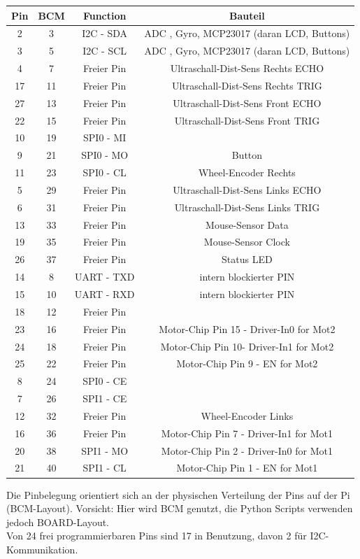 \documentclass[twoside,12pt,a4paper]{report}
\begin{document}
	\begin{center}
		\begin{tabular}{|cc|c|c|}
			\hline
			Pin 	&BCM		& Function 		& Bauteil\\
			\hline
			2		&3			& I2C - SDA		& ADC , Gyro, MCP23017 (daran LCD, Buttons) \\
			3 		&5			& I2C - SCL		& ADC , Gyro, MCP23017 (daran LCD, Buttons)\\
			4		&7			& Freier Pin	& Ultraschall-Dist-Sens Rechts ECHO\\
			17		&11 		& Freier Pin	& Ultraschall-Dist-Sens Rechts TRIG	\\
			27		&13 		& Freier Pin	& Ultraschall-Dist-Sens Front ECHO	\\
			22		&15 		& Freier Pin	& Ultraschall-Dist-Sens Front TRIG	\\
			10		&19 		& SPI0 - MI		& 	\\
			9		&21 		& SPI0 - MO		& Button		\\
			11		&23 		& SPI0 - CL		& Wheel-Encoder Rechts		\\
			5		&29 		& Freier Pin	& Ultraschall-Dist-Sens Links ECHO		\\
			6		&31 		& Freier Pin	& Ultraschall-Dist-Sens Links TRIG	\\
			13		&33 		& Freier Pin	& Mouse-Sensor Data	\\	
			19		&35 		& Freier Pin	& Mouse-Sensor Clock	\\
			26		&37 		& Freier Pin	& Status LED\\
			14		&8 			& UART - TXD	& 	intern blockierter PIN\\
			15		&10 		& UART - RXD	&  	intern blockierter PIN\\
			18		&12 		& Freier Pin	& 	\\
			23 		&16 		& Freier Pin	& Motor-Chip Pin 15 - Driver-In0 for Mot2	\\
			24		&18 		& Freier Pin	& Motor-Chip Pin 10- Driver-In1 for Mot2	\\
			25		&22 		& Freier Pin	& Motor-Chip Pin 9 - EN for Mot2	\\
			8		&24 		& SPI0 - CE		& 	\\
			7		&26 		& SPI1 - CE		&  	\\
			12		&32 		& Freier Pin	& Wheel-Encoder Links	\\
			16		&36 		& Freier Pin	& Motor-Chip Pin 7 - Driver-In1 for Mot1	\\
			20		&38 		& SPI1 - MO		& Motor-Chip Pin 2 - Driver-In0 for Mot1		\\
			21		&40 		& SPI1	- CL	& Motor-Chip Pin 1 - EN for Mot1	\\
			\hline
		\end{tabular}
	\end{center}
	Die Pinbelegung orientiert sich an der physischen Verteilung der Pins auf der Pi (BCM-Layout). Vorsicht: Hier wird BCM genutzt, die Python Scripts verwenden jedoch BOARD-Layout. \\
	Von 24 frei programmierbaren Pins sind 17 in Benutzung, davon 2 für I2C-Kommunikation. 
	
\end{document}
